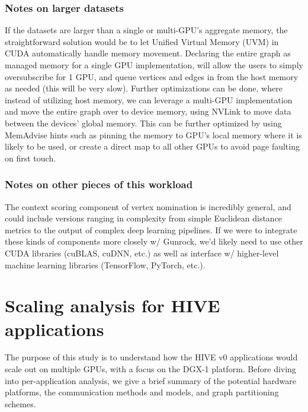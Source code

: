 \documentclass[10pt,oneside]{memoir}
\begin{document}
\hypertarget{notes-on-larger-datasets-9}{%
\subsection{Notes on larger datasets}\label{notes-on-larger-datasets-9}}

If the datasets are larger than a single or multi-GPU's aggregate
memory, the straightforward solution would be to let Unified Virtual
Memory (UVM) in CUDA automatically handle memory movement. Declaring the
entire graph as managed memory for a single GPU implementation, will
allow the users to simply oversubscribe for 1 GPU, and queue vertices
and edges in from the host memory as needed (this will be very slow).
Further optimizations can be done, where instead of utilizing host
memory, we can leverage a multi-GPU implementation and move the entire
graph over to device memory, using NVLink to move data between the
devices' global memory. This can be further optimized by using MemAdvise
hints such as pinning the memory to GPU's local memory where it is
likely to be used, or create a direct map to all other GPUs to avoid
page faulting on first touch.

\hypertarget{notes-on-other-pieces-of-this-workload-9}{%
\subsection{Notes on other pieces of this
workload}\label{notes-on-other-pieces-of-this-workload-9}}

The context scoring component of vertex nomination is incredibly
general, and could include versions ranging in complexity from simple
Euclidean distance metrics to the output of complex deep learning
pipelines. If we were to integrate these kinds of components more
closely w/ Gunrock, we'd likely need to use other CUDA libraries
(cuBLAS, cuDNN, etc.) as well as interface w/ higher-level machine
learning libraries (TensorFlow, PyTorch, etc.).

\hypertarget{scaling-analysis-for-hive-applications-1}{%
\chapter{Scaling analysis for HIVE
applications}\label{scaling-analysis-for-hive-applications-1}}

The purpose of this study is to understand how the HIVE v0 applications
would scale out on multiple GPUs, with a focus on the DGX-1 platform.
Before diving into per-application analysis, we give a brief summary of
the potential hardware platforms, the communication methods and models,
and graph partitioning schemes.
\end{document}
